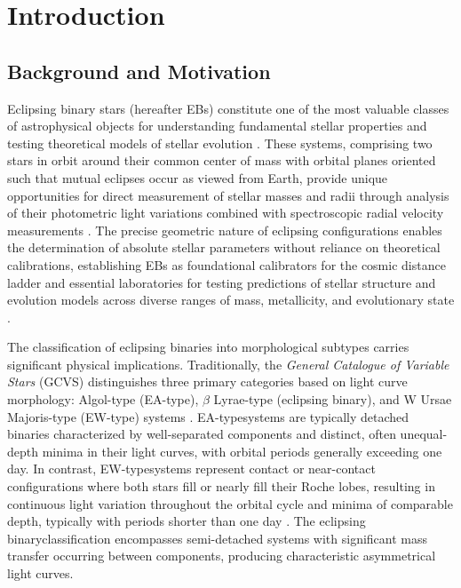 \documentclass[11pt,a4paper]{article}
\newcommand{\EB}{eclipsing binary}
\newcommand{\EA}{EA-type}
\newcommand{\EW}{EW-type}
\begin{document}
\section{Introduction}\label{sec:introduction}

\subsection{Background and Motivation}

Eclipsing binary stars (hereafter EBs) constitute one of the most valuable classes of astrophysical objects for understanding fundamental stellar properties and testing theoretical models of stellar evolution \citep{torres2010binary, mamajek2015iau}. These systems, comprising two stars in orbit around their common center of mass with orbital planes oriented such that mutual eclipses occur as viewed from Earth, provide unique opportunities for direct measurement of stellar masses and radii through analysis of their photometric light variations combined with spectroscopic radial velocity measurements \citep{andersen1991accurate}. The precise geometric nature of eclipsing configurations enables the determination of absolute stellar parameters without reliance on theoretical calibrations, establishing EBs as foundational calibrators for the cosmic distance ladder \citep{pietrzynski2019distance} and essential laboratories for testing predictions of stellar structure and evolution models across diverse ranges of mass, metallicity, and evolutionary state \citep{stassun2014empirical}.

The classification of eclipsing binaries into morphological subtypes carries significant physical implications. Traditionally, the \textit{General Catalogue of Variable Stars} (GCVS) distinguishes three primary categories based on light curve morphology: Algol-type (\EA), $\beta$ Lyrae-type (\EB), and W Ursae Majoris-type (\EW) systems \citep{samus2017general}. \EA systems are typically detached binaries characterized by well-separated components and distinct, often unequal-depth minima in their light curves, with orbital periods generally exceeding one day. In contrast, \EW systems represent contact or near-contact configurations where both stars fill or nearly fill their Roche lobes, resulting in continuous light variation throughout the orbital cycle and minima of comparable depth, typically with periods shorter than one day \citep{eggleton2006evolution}. The \EB classification encompasses semi-detached systems with significant mass transfer occurring between components, producing characteristic asymmetrical light curves.
\end{document}

